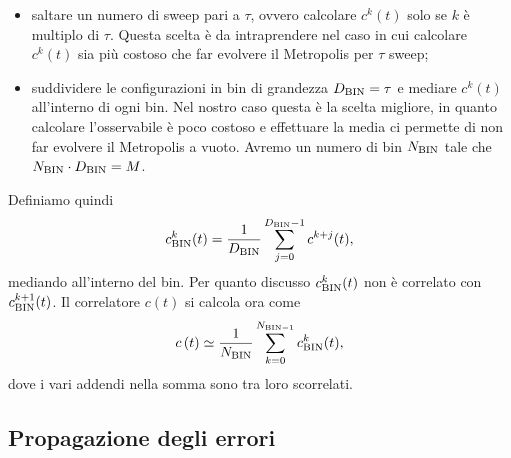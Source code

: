 \documentclass{article}
\begin{document}
\begin{itemize}
    \item saltare un numero di sweep pari a $\tau$, ovvero calcolare $c^k(t)$ solo se $k$ è multiplo di $\tau$. Questa scelta è da intraprendere nel caso in cui calcolare $c^k(t)$ sia più costoso che far evolvere il Metropolis per $\tau$ sweep;
    \item suddividere le configurazioni in bin di grandezza $D_{\textup{BIN}}=\tau$ e mediare $c^k(t)$ all'interno di ogni bin. Nel nostro caso questa è la scelta migliore, in quanto calcolare l'osservabile è poco costoso e effettuare la media ci permette di non far evolvere il Metropolis a vuoto. Avremo un numero di bin $N_{\textup{BIN}}$ tale che $N_{\textup{BIN}}\cdot D_{\textup{BIN}}=M$.
\end{itemize}
Definiamo quindi 
\begin{equation}
    \label{cbinnate}
    c^k_{\textup{BIN}}(t)=\frac{1}{D_{\textup{BIN}}}\sum_{j=0}^{D_{\textup{BIN}}-1} c^{k+j}(t),
\end{equation}
mediando all'interno del bin. Per quanto discusso $c^k_{\textup{BIN}}(t)$ non è correlato con $c^{k+1}_{\textup{BIN}}(t)$. Il correlatore $c(t)$ si calcola ora come 
\begin{equation}
    \label{che freddo}
    c\,(t)\simeq \frac{1}{N_{\textup{BIN}}} \sum_{k=0}^{N_{\textup{BIN}-1}} c_{\textup{BIN}}^k(t),
\end{equation}
dove i vari addendi nella somma sono tra loro scorrelati.


\subsection{Propagazione degli errori}
\end{document}
